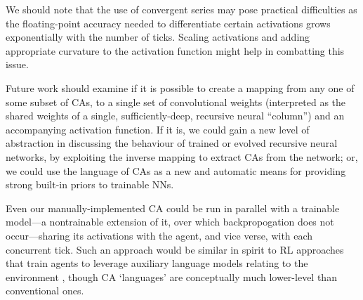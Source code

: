 \documentclass{article}
\begin{document}
We should note that the use of convergent series may pose practical difficulties as the floating-point accuracy needed to differentiate certain activations grows exponentially with the number of ticks. Scaling activations and adding appropriate curvature to the activation function might help in combatting this issue.

Future work should examine if it is possible to create a mapping from any one of some subset of CAs, to a single set of convolutional weights (interpreted as the shared weights of a single, sufficiently-deep, recursive neural ``column'') and an accompanying activation function.
If it is, we could gain a new level of abstraction in discussing the behaviour of trained or evolved recursive neural networks, by exploiting the inverse mapping to extract CAs from the network; or, we could use the language of CAs as a new and automatic means for providing strong built-in priors to trainable NNs. 

Even our manually-implemented CA could be run in parallel with a trainable model---a nontrainable extension of it, over which backpropogation does not occur---sharing its activations with the agent, and vice verse, with each concurrent tick.
Such an approach would be similar in spirit to RL approaches that train agents to leverage auxiliary language models relating to the environment \cite{hu2019hierarchical}, though CA `languages' are conceptually much lower-level than conventional ones.



\end{document}
